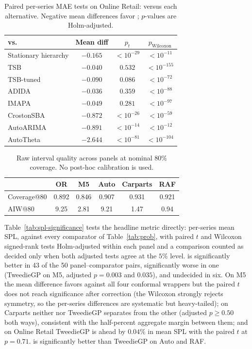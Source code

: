 \begin{table}[t]
\centering
\caption{Paired per-series MAE tests on Online Retail: \EBB{} versus
each alternative. Negative mean differences favor \EBB{}; $p$-values
are Holm-adjusted.}
\label{tab:significance}
\small
\setlength{\tabcolsep}{5pt}
\begin{tabular}{lccc}
\toprule
vs. & Mean diff & $p_t$ & $p_{\mathrm{Wilcoxon}}$\\
\midrule
Stationary hierarchy & $-0.165$ & $<10^{-29}$ & $<10^{-11}$\\
TSB & $-0.040$ & $0.532$ & $<10^{-155}$\\
TSB-tuned & $-0.090$ & $0.086$ & $<10^{-72}$\\
ADIDA & $-0.036$ & $0.359$ & $<10^{-88}$\\
IMAPA & $-0.049$ & $0.281$ & $<10^{-97}$\\
CrostonSBA & $-0.872$ & $<10^{-26}$ & $<10^{-59}$\\
AutoARIMA & $-0.891$ & $<10^{-14}$ & $<10^{-12}$\\
AutoTheta & $-2.644$ & $<10^{-81}$ & $<10^{-104}$\\
\bottomrule
\end{tabular}
\end{table}

\begin{table}[t]
\centering
\caption{Raw \EBB{} interval quality across panels at nominal $80\%$
coverage. No post-hoc calibration is used.}
\label{tab:coverage}
\small
\setlength{\tabcolsep}{4.6pt}
\begin{tabular}{lccccc}
\toprule
 & OR & M5 & Auto & Carparts & RAF\\
\midrule
Coverage@80 & 0.892 & 0.846 & 0.907 & 0.931 & 0.921\\
AIW@80 & 9.25 & 2.81 & 9.21 & 1.47 & 0.94\\
\bottomrule
\end{tabular}
\end{table}

Table~\ref{tab:spl-significance} tests the headline metric directly:
per-series mean SPL, \EBB{} against every comparator of
Table~\ref{tab:prob}, with paired $t$ and Wilcoxon signed-rank tests
Holm-adjusted within each panel and a comparison counted as decided only
when both adjusted tests agree at the $5\%$ level. \EBB{} is
significantly better in 43 of the 50 panel--comparator pairs,
significantly worse in one (TweedieGP on M5, adjusted $p=0.003$ and
$0.035$), and undecided in six. On M5 the mean difference favors
\EBB{} against all four conformal wrappers but the paired $t$ does not
reach significance after correction (the Wilcoxon strongly rejects
symmetry, so the per-series differences are systematic but
heavy-tailed); on Carparts neither \EBB{} nor TweedieGP separates from
the other (adjusted $p\ge0.50$ both ways), consistent with the
half-percent aggregate margin between them; and on Online Retail
TweedieGP is ahead by $0.04\%$ in mean SPL with the paired $t$ at
$p=0.71$. \EBB{} is significantly better than TweedieGP on Auto and
RAF.

